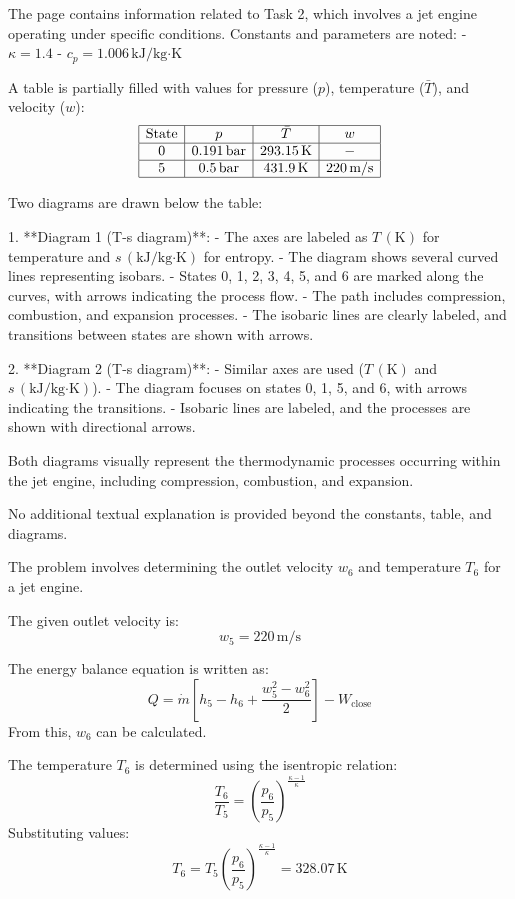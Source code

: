 The page contains information related to Task 2, which involves a jet engine operating under specific conditions. Constants and parameters are noted:  
- \( \kappa = 1.4 \)  
- \( c_p = 1.006 \, \text{kJ/kg·K} \)  

A table is partially filled with values for pressure (\( p \)), temperature (\( \bar{T} \)), and velocity (\( w \)):  
\[
\begin{array}{|c|c|c|c|}
\hline
\text{State} & p & \bar{T} & w \\
\hline
0 & 0.191 \, \text{bar} & 293.15 \, \text{K} & - \\
\hline
5 & 0.5 \, \text{bar} & 431.9 \, \text{K} & 220 \, \text{m/s} \\
\hline
\end{array}
\]

Two diagrams are drawn below the table:  

1. **Diagram 1 (T-s diagram)**:  
   - The axes are labeled as \( T \, (\text{K}) \) for temperature and \( s \, (\text{kJ/kg·K}) \) for entropy.  
   - The diagram shows several curved lines representing isobars.  
   - States 0, 1, 2, 3, 4, 5, and 6 are marked along the curves, with arrows indicating the process flow.  
   - The path includes compression, combustion, and expansion processes.  
   - The isobaric lines are clearly labeled, and transitions between states are shown with arrows.  

2. **Diagram 2 (T-s diagram)**:  
   - Similar axes are used (\( T \, (\text{K}) \) and \( s \, (\text{kJ/kg·K}) \)).  
   - The diagram focuses on states 0, 1, 5, and 6, with arrows indicating the transitions.  
   - Isobaric lines are labeled, and the processes are shown with directional arrows.  

Both diagrams visually represent the thermodynamic processes occurring within the jet engine, including compression, combustion, and expansion.  

No additional textual explanation is provided beyond the constants, table, and diagrams.

The problem involves determining the outlet velocity \( w_6 \) and temperature \( T_6 \) for a jet engine.  

The given outlet velocity is:  
\[
w_5 = 220 \, \text{m/s}
\]  

The energy balance equation is written as:  
\[
Q = \dot{m} \left[ h_5 - h_6 + \frac{w_5^2 - w_6^2}{2} \right] - W_{\text{close}}
\]  
From this, \( w_6 \) can be calculated.  

The temperature \( T_6 \) is determined using the isentropic relation:  
\[
\frac{T_6}{T_5} = \left( \frac{p_6}{p_5} \right)^{\frac{\kappa - 1}{\kappa}}
\]  
Substituting values:  
\[
T_6 = T_5 \left( \frac{p_6}{p_5} \right)^{\frac{\kappa - 1}{\kappa}} = 328.07 \, \text{K}
\]

